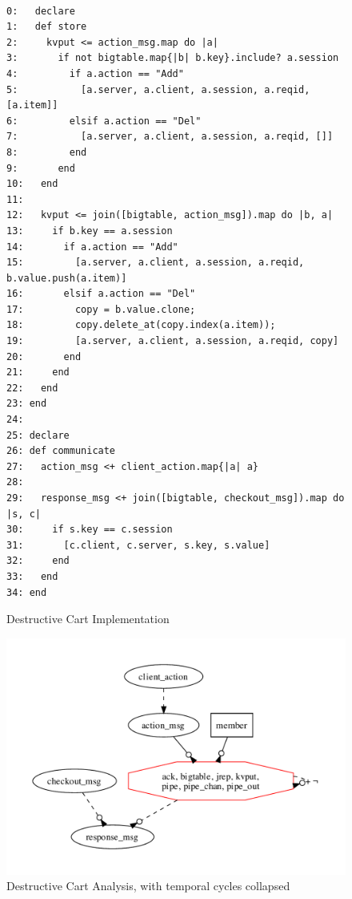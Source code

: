 \begin{figure}[t]
\begin{scriptsize}
\begin{verbatim}

0:   declare
1:   def store
2:     kvput <= action_msg.map do |a|
3:       if not bigtable.map{|b| b.key}.include? a.session
4:         if a.action == "Add"
5:           [a.server, a.client, a.session, a.reqid, [a.item]]
6:         elsif a.action == "Del"
7:           [a.server, a.client, a.session, a.reqid, []]
8:         end
9:       end
10:   end  
11:
12:   kvput <= join([bigtable, action_msg]).map do |b, a|
13:     if b.key == a.session
14:       if a.action == "Add"
15:         [a.server, a.client, a.session, a.reqid, b.value.push(a.item)]
16:       elsif a.action == "Del"
17:         copy = b.value.clone;
18:         copy.delete_at(copy.index(a.item));
19:         [a.server, a.client, a.session, a.reqid, copy]
20:       end
21:     end
22:   end
23: end
24:
25: declare
26: def communicate
27:   action_msg <+ client_action.map{|a| a}
28:
29:   response_msg <+ join([bigtable, checkout_msg]).map do |s, c|
30:     if s.key == c.session
31:       [c.client, c.server, s.key, s.value]
32:     end
33:   end
34: end
\end{verbatim}
\end{scriptsize}
\caption{Destructive Cart Implementation}
\label{fig:pdg-destructive}
\end{figure}

\begin{figure}[t]
\centering
\includegraphics[width=0.9\linewidth]{fig/destructive.pdf}

\caption{Destructive Cart Analysis, with temporal cycles collapsed}
\label{fig:pdg-destructive-analysis}
\end{figure}


